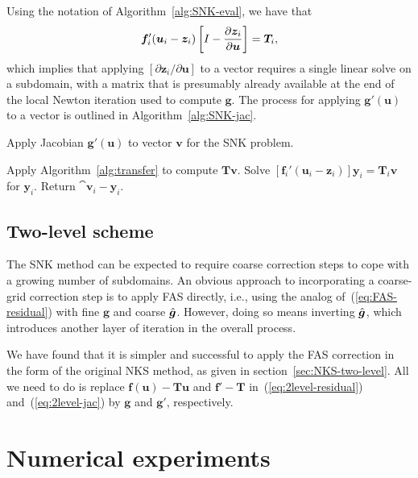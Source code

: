 Using the notation of Algorithm~\ref{alg:SNK-eval}, we have that
\[
  \bm{f}_i'(\bm{u}_i-\bm{z}_i) \left[I - \frac{\partial \bm{z}_i}{\partial \bm{u}} \right] = \bm{T}_i,
\]
which implies that applying $[\partial \bm{z}_i/\partial \bm{u}]$ to a vector requires a single linear solve on a subdomain, with a matrix that is presumably already available at the end of the local Newton iteration used to compute $\bm{g}$. The process for applying $\bm{g}'(\bm{u})$ to a vector is outlined in Algorithm~\ref{alg:SNK-jac}. 
\begin{algorithm}
  \caption{Apply Jacobian $\bm{g}'(\bm{u})$ to vector $\bm{v}$ for the SNK problem.}
  \label{alg:SNK-jac}
  \begin{algorithmic}
    \STATE Apply Algorithm~\ref{alg:transfer} to compute $\bm{T}\bm{v}$.
    \STATE Solve $[\bm{f}_i'(\bm{u}_i-\bm{z}_i)] \bm{y}_i = \bm{T}_i\bm{v}$ for $\bm{y}_i$.
    \ENDFOR
    \STATE Return $\cat{\bm{v}_i - \bm{y}_i}$. 
  \end{algorithmic}
\end{algorithm}



\subsection{Two-level scheme}
\label{sec:SNK-two-level}

The SNK method can be expected to require coarse correction steps to cope with a growing number of subdomains. An obvious approach to incorporating a coarse-grid correction step is to apply FAS directly, i.e., using the analog of~(\ref{eq:FAS-residual}) with fine $\bm{g}$ and coarse $\hat{\bm{g}}$. However, doing so means inverting $\hat{\bm{g}}$, which introduces another layer of iteration in the overall process.

We have found that it is simpler and successful to apply the FAS correction in the form of the original NKS method, as given in section~\ref{sec:NKS-two-level}. All we need to do is replace $\bm{f}(\bm{u})-\bm{T}\bm{u}$ and $\bm{f}'-\bm{T}$ in~(\ref{eq:2level-residual}) and~(\ref{eq:2level-jac})  by $\bm{g}$ and $\bm{g}'$, respectively. 



\section{Numerical experiments}
\label{sec:experiments}

